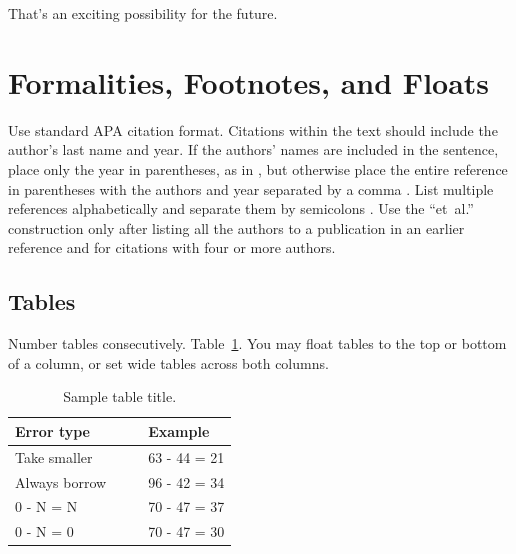 \documentclass[10pt,letterpaper]{article}
\begin{document}
That's an exciting possibility for the future.

\section{Formalities, Footnotes, and Floats}

Use standard APA citation format. Citations within the text should
include the author's last name and year. If the authors' names are
included in the sentence, place only the year in parentheses, as in
, but otherwise place the entire reference in
parentheses with the authors and year separated by a comma
\cite{NewellSimon1972a}. List multiple references alphabetically and
separate them by semicolons
\cite{ChalnickBillman1988a,NewellSimon1972a}. Use the
``et~al.'' construction only after listing all the authors to a
publication in an earlier reference and for citations with four or
more authors.


\subsection{Tables}

Number tables consecutively. Table~\ref{sample-table}. You may float
tables to the top or bottom of a column, or set wide tables across
both columns.

 	\begin{table}[!ht]
\begin{center} 
\caption{Sample table title.} 
\label{sample-table} 
\vskip 0.12in
\begin{tabular}{ll} 
\hline
Error type    &  Example \\
\hline
Take smaller        &   63 - 44 = 21 \\
Always borrow~~~~   &   96 - 42 = 34 \\
0 - N = N           &   70 - 47 = 37 \\
0 - N = 0           &   70 - 47 = 30 \\
\hline
\end{tabular} 
\end{center} 
\end{table}
\end{document}
